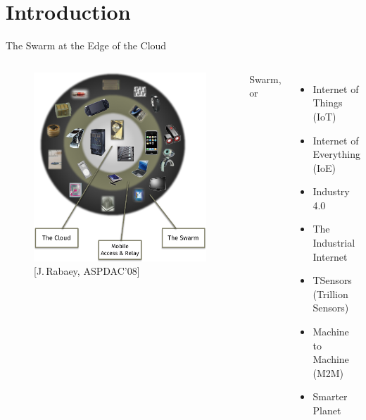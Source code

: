 \section{Introduction}

\begin{frame}{The Swarm at the Edge of the Cloud}
  \pause

  \begin{columns}
    \begin{figure}
      \includegraphics[width=\textwidth]{figures/swarm_jan.pdf}
      \captionsetup{labelformat=empty}
      \caption{[J.\,Rabaey, ASPDAC'08]}
    \end{figure}

    \pause

    Swarm, or
    \begin{itemize}
    \item Internet of Things (IoT)
    \item Internet of Everything (IoE)
    \item Industry 4.0
    \item The Industrial Internet
    \item TSensors (Trillion Sensors)
    \item Machine to Machine (M2M)
    \item Smarter Planet
    \end{itemize}
  \end{columns}
\end{frame}

